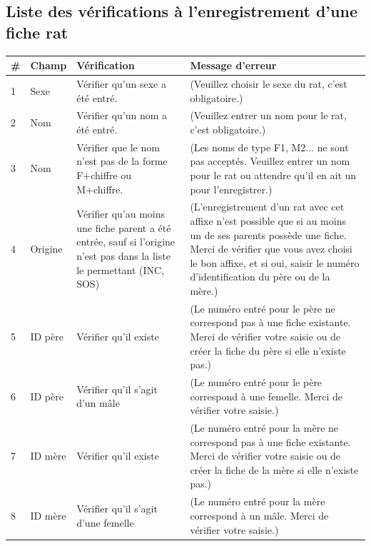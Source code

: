 \documentclass[a4paper,10pt]{article}
\begin{document}
\subsection{Liste des vérifications à l'enregistrement d'une fiche rat}
\label{app:verifs}
\small
\noindent\begin{tabular}{|p{0.35cm}|p{1.35cm}|p{5cm}|p{8.5cm}|}\hline
\textbf{\#} & \textbf{Champ} & \textbf{Vérification} & \textbf{Message d'erreur}\\\hline

1 & Sexe & Vérifier qu'un sexe a été entré. & (Veuillez choisir le sexe du rat, c'est obligatoire.) \\\hline

2 & Nom & Vérifier qu'un nom a été entré. &(Veuillez entrer un nom pour le rat, c'est obligatoire.) \\\hline

3 & Nom & Vérifier que le nom n'est pas de la forme F+chiffre ou M+chiffre. & (Les noms de type F1, M2... ne sont pas acceptés. Veuillez entrer un nom pour le rat ou attendre qu'il en ait un pour l'enregistrer.) \\\hline

4 & Origine & Vérifier qu'au moins une fiche parent a été entrée, sauf si l'origine n'est pas dans la liste le permettant (INC, SOS) & (L'enregistrement d'un rat avec cet affixe n'est possible que si au moins un de ses parents possède une fiche. Merci de vérifier que vous avez choisi le bon affixe, et si oui, saisir le numéro d'identification du père ou de la mère.) \\\hline

5 & ID père & Vérifier qu'il existe & (Le numéro entré pour le père ne correspond pas à une fiche existante. Merci de vérifier votre saisie ou de créer la fiche du père si elle n'existe pas.) \\\hline


6 & ID père & Vérifier qu'il s'agit d'un mâle & (Le numéro entré pour le père correspond à une femelle. Merci de vérifier votre saisie.)\\\hline


7 & ID mère & Vérifier qu'il existe & (Le numéro entré pour la mère ne correspond pas à une fiche existante. Merci de vérifier votre saisie ou de créer la fiche de la mère si elle n'existe pas.)\\\hline


8 & ID mère & Vérifier qu'il s'agit d'une femelle & (Le numéro entré pour la mère correspond à un mâle. Merci de vérifier votre saisie.) \\\hline



\end{tabular}
\end{document}
